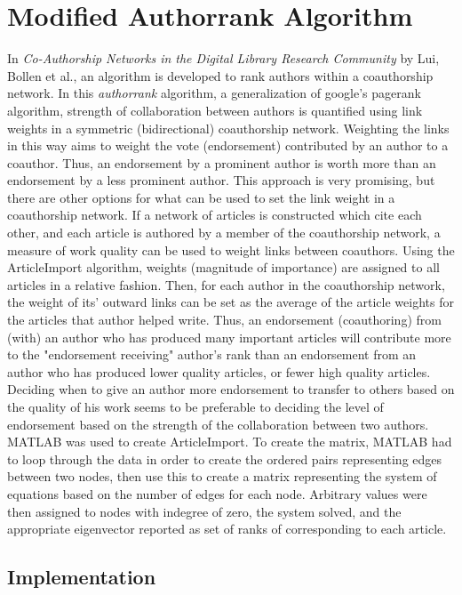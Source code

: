 \documentclass[17pt]{extarticle}
\begin{document}
\section{Modified Authorrank Algorithm}

In \textit{Co-Authorship Networks in the Digital Library Research Community} by Lui, Bollen et al., an algorithm is developed to rank authors within a coauthorship network. In this \textit{authorrank} algorithm, a generalization of google's pagerank algorithm, strength of collaboration between authors is quantified using link weights in a symmetric (bidirectional) coauthorship network. Weighting the links in this way aims to weight the vote (endorsement) contributed by an author to a coauthor. Thus, an endorsement by a prominent author is worth more than an endorsement by a less prominent author. 
  This approach is very promising, but there are other options for what can be used to set the link weight in a coauthorship network. If a network of articles is constructed which cite each other, and each article is authored by a member of the coauthorship network, a measure of work quality can be used to weight links between coauthors. Using the ArticleImport algorithm, weights (magnitude of importance) are assigned to all articles in a relative fashion. Then, for each author in the coauthorship network, the weight of its' outward links can be set as the average of the article weights for the articles that author helped write. Thus, an endorsement (coauthoring) from (with) an author who has produced many important articles will contribute more to the "endorsement receiving" author's rank than an endorsement from an author who has produced lower quality articles, or fewer high quality articles. Deciding when to give an author more endorsement to transfer to others based on the quality of his work seems to be preferable to deciding the level of endorsement based on the strength of the collaboration between two authors. 
   MATLAB was used to create ArticleImport. To create the matrix, MATLAB had to loop through the data in order to create the ordered pairs representing edges between two nodes, then use this to create a matrix representing the system of equations based on the number of edges for each node. Arbitrary values were then assigned to nodes with indegree of zero, the system solved, and the appropriate eigenvector reported as set of ranks of corresponding to each article.
   
\subsection{Implementation} 
\end{document}
